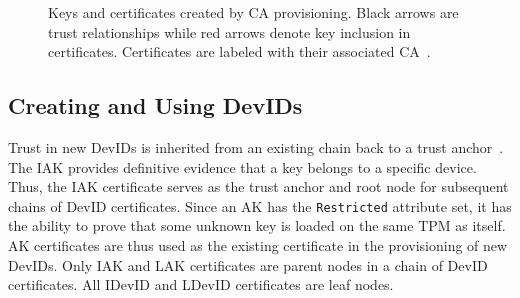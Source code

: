 \documentclass[runningheads]{llncs}
\begin{document}

\begin{figure}[hbtp]
  \centering
  
  \caption{Keys and certificates created by CA provisioning.
    Black arrows are trust relationships while red
    arrows denote key inclusion in certificates. Certificates are
    labeled with their associated CA~\citep{DevIDSpec-TCG}.}
  \label{fig:cert_rel}
\end{figure}

\subsection{Creating and Using DevIDs}

Trust in new DevIDs is inherited from an existing chain back to a
trust anchor~\citep{DevIDSpec-TCG}.  The IAK provides definitive
evidence that a key belongs to a specific device.  Thus, the IAK
certificate serves as the trust anchor and root node for subsequent
chains of DevID certificates.  Since an AK has the \verb|Restricted|
attribute set, it has the ability to prove that some unknown key is
loaded on the same TPM as itself.  AK certificates are thus used as
the existing certificate in the provisioning of new DevIDs.  Only IAK
and LAK certificates are parent nodes in a chain of DevID
certificates.  All IDevID and LDevID certificates are leaf nodes.

\end{document}
